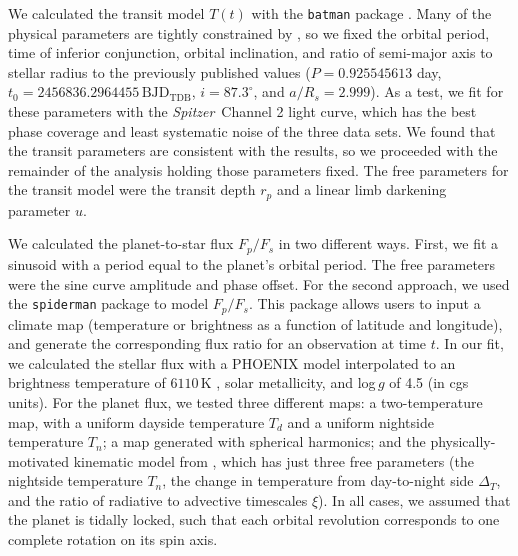 \documentclass[twocolumn]{aastex61}
\newcommand{\project}[1]{\textsl{#1}}
\newcommand{\Spitzer}{\project{Spitzer}}
\begin{document}
We calculated the transit model $T(t)$ with the \texttt{batman} package \citep{kreidberg15a}. Many of the physical parameters are tightly constrained by \cite{southworth15}, so we fixed the orbital period, time of inferior conjunction, orbital inclination, and ratio of semi-major axis to stellar radius to the previously published values ($P = 0.925545613$ day, $t_0 = 2456836.2964455\,\mathrm{BJD_{TDB}}$, $i = 87.3^\circ$, and $a/R_s = 2.999$). As a test, we fit for these parameters with the \Spitzer\ Channel 2 light curve, which has the best phase coverage and least systematic noise of the three data sets. We found that the transit parameters are consistent with the \cite{southworth15} results, so we proceeded with the remainder of the analysis holding those parameters fixed.  The free parameters for the transit model were the transit depth $r_p$ and a linear limb darkening parameter $u$. 

We calculated the planet-to-star flux $F_p/F_s$ in two different ways. First, we fit a sinusoid with a period equal to the planet's orbital period. The free parameters were the sine curve amplitude and phase offset. For the second approach, we used the \texttt{spiderman} package \citep{louden17} to model $F_p/F_s$. This package allows users to input a climate map (temperature or brightness as a function of latitude and longitude), and generate the corresponding flux ratio for an observation at time $t$. In our fit, we calculated the stellar flux with a PHOENIX model \citep{husser13} interpolated to an brightness temperature of $6110\,\mathrm{K}$ \citep{gillon14}, solar metallicity, and log\,$g$ of 4.5 (in cgs units).  For the planet flux, we tested three different maps: a two-temperature map, with a uniform dayside temperature $T_d$ and a uniform nightside temperature $T_n$; a map generated with spherical harmonics; and the physically-motivated kinematic model from \cite{zhang17}, which has just three free parameters (the nightside temperature $T_n$, the change in temperature from day-to-night side $\Delta_T$, and the ratio of radiative to advective timescales $\xi$).  In all cases, we assumed that the planet is tidally locked, such that each orbital revolution corresponds to one complete rotation on its spin axis. 
\end{document}
